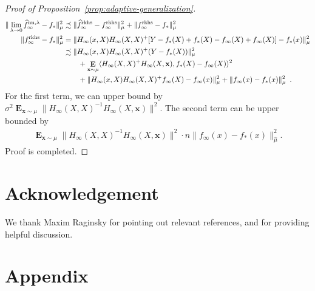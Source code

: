\documentclass[11pt]{article}
\numberwithin{equation}{section}
\def\E{\mathop{\mathbf{E}}}
\def\bd#1{\mathbf{#1}}
\def\bx{\bd{x}}
\begin{document}
\begin{proof}[Proof of Proposition~\ref{prop:adaptive-generalization}]
    \begin{align*}
        \| \lim_{\lambda \rightarrow 0} \widehat{f}^{{\rm nn}, \lambda}_{\infty}- f_*\|^2_{\mu} & \precsim \| \widehat{f}^{\rm rkhs}_{\infty} - f^{\rm rkhs}_{\infty}  \|_\mu^2 + \| f^{\rm rkhs}_{\infty}  - f_* \|_{\mu}^2 \\
        \| f^{\rm rkhs}_{\infty}  - f_* \|_{\mu}^2  & = \| H_{\infty}(x, X) H_{\infty}(X, X)^{+} [Y - f_*(X) + f_*(X) - f_\infty(X) + f_\infty(X)] - f_*(x)\|_\mu^2 \\
        & \precsim \| H_{\infty}(x, X) H_{\infty}(X, X)^{+} (Y - f_*(X)) \|_{\mu}^2 \\
        & \quad \quad + \E_{\bx \sim \mu} \langle H_{\infty}(X, X)^{+}H_{\infty}(X, \bx) , f_*(X) - f_\infty(X)\rangle^2 \\
        & \quad \quad + \| H_{\infty}(x, X) H_{\infty}(X, X)^{+} f_\infty(X) - f_\infty(x) \|_{\mu}^2 + \|f_\infty(x)  - f_*(x) \|_{\mu}^2 \enspace.
    \end{align*}
    For the first term, we can upper bound by $\sigma^2 \E_{\bx \sim \mu} \| H_\infty(X, X)^{-1} H_\infty(X, \bx)\|^2$. The second term can be upper bounded by 
    \begin{align*}
        \E_{\bx \sim \mu} \| H_\infty(X, X)^{-1} H_\infty(X, \bx)\|^2 \cdot n \|f_\infty(x)  - f_*(x) \|_{\hat{\mu}}^2.
    \end{align*}
    Proof is completed.
\end{proof}






\section*{Acknowledgement}
    We thank Maxim Raginsky for pointing out relevant references, and for providing helpful discussion. 







\newpage
\appendix

\clearpage
\setcounter{page}{1}

\section{Appendix}
\end{document}
